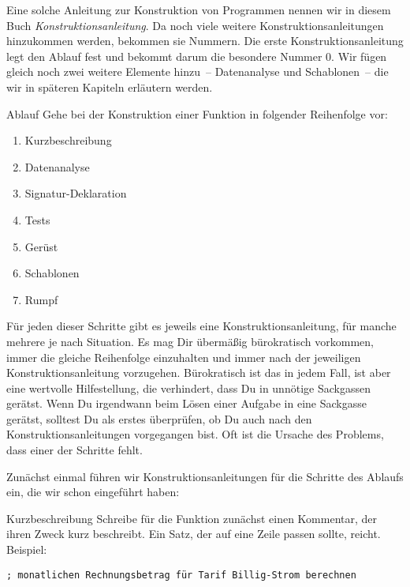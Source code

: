 Eine solche Anleitung zur Konstruktion von Programmen nennen wir in
diesem Buch
\textit{Konstruktionsanleitung}.  Da
noch viele weitere Konstruktionsanleitungen hinzukommen werden,
bekommen sie Nummern.  Die erste Konstruktionsanleitung legt den
Ablauf fest und bekommt darum die besondere Nummer 0.
Wir fügen gleich noch zwei weitere Elemente
hinzu~-- Datenanalyse und Schablonen~-- die wir in späteren Kapiteln
erläutern werden.

\setcounter{xkonstruktionsanleitung}{-1}

\begin{konstruktionsanleitung}{Ablauf}
  Gehe bei der Konstruktion einer Funktion in folgender Reihenfolge
  vor:
  \begin{enumerate}
    \item Kurzbeschreibung
    \item Datenanalyse
    \item Signatur-Deklaration
    \item Tests
    \item Gerüst
    \item Schablonen
    \item Rumpf
    \end{enumerate}
\end{konstruktionsanleitung}
%
Für jeden dieser Schritte gibt es jeweils eine Konstruktionsanleitung,
für manche mehrere je nach Situation.  Es mag Dir übermäßig
bürokratisch vorkommen, immer die gleiche Reihenfolge einzuhalten und
immer nach der jeweiligen Konstruktionsanleitung vorzugehen.
Bürokratisch ist das in jedem Fall, ist aber eine wertvolle
Hilfestellung, die verhindert, dass Du in unnötige Sackgassen
gerätst.  Wenn Du irgendwann beim Lösen einer Aufgabe in
eine Sackgasse gerätst, solltest Du als erstes überprüfen, ob Du auch
nach den Konstruktionsanleitungen vorgegangen bist.  Oft ist die
Ursache des Problems, dass einer der Schritte fehlt.

Zunächst einmal führen wir Konstruktionsanleitungen für die Schritte
des Ablaufs ein, die wir schon eingeführt haben:

\begin{konstruktionsanleitung}{Kurzbeschreibung}
  \label{ka:kurzbeschreibung}
  Schreibe für die Funktion zunächst einen Kommentar, der ihren Zweck
  kurz beschreibt.  Ein Satz, der auf eine Zeile passen sollte,
  reicht.  Beispiel:
\begin{lstlisting}
; monatlichen Rechnungsbetrag für Tarif Billig-Strom berechnen
\end{lstlisting}
\end{konstruktionsanleitung}

